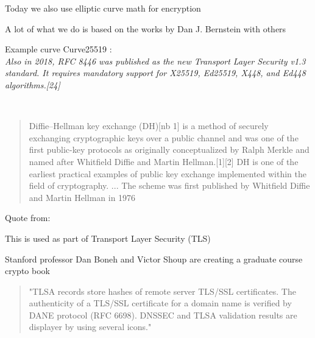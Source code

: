 \documentclass[Screen16to9,17pt]{foils}
\begin{document}
\begin{list2}
\item Today we also use elliptic curve math for encryption 
\item A lot of what we do is based on the works by Dan J. Bernstein  with others
\item Example curve Curve25519 :\\
\emph{Also in 2018, RFC 8446 was published as the new Transport Layer Security v1.3 standard. It requires mandatory support for X25519, Ed25519, X448, and Ed448 algorithms.[24]}
\end{list2}



{~}

\begin{quote}
Diffie–Hellman key exchange (DH)[nb 1] is a method of securely exchanging cryptographic keys over a public channel and was one of the first public-key protocols as originally conceptualized by Ralph Merkle and named after Whitfield Diffie and Martin Hellman.[1][2] DH is one of the earliest practical examples of public key exchange implemented within the field of cryptography.
... The scheme was first published by Whitfield Diffie and Martin Hellman in 1976
\end{quote}

\begin{list2}
\item Quote from: {\small {}}
\item This is used as part of Transport Layer Security (TLS)
\item Stanford professor Dan Boneh and Victor Shoup are creating a graduate course crypto book  
\end{list2}




\begin{quote}
"TLSA records store hashes of remote server TLS/SSL certificates. The authenticity of a TLS/SSL certificate for a domain name is verified by DANE protocol (RFC 6698). DNSSEC and TLSA validation results are displayer by using several icons."
\end{quote}
\end{document}
